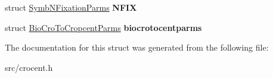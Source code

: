 \begin{DoxyCompactItemize}
\item 
\hypertarget{structcropcent_environment_a3fb9ba143595d6a68b7490a5c789a039}{struct \hyperlink{struct_symb_n_fixation_parms}{Symb\-N\-Fixation\-Parms} {\bfseries N\-F\-I\-X}}\label{structcropcent_environment_a3fb9ba143595d6a68b7490a5c789a039}

\item 
\hypertarget{structcropcent_environment_a3de6f21e80ca892d2b467459a710e5b6}{struct \hyperlink{struct_bio_cro_to_cropcent_parms}{Bio\-Cro\-To\-Cropcent\-Parms} {\bfseries biocrotocentparms}}\label{structcropcent_environment_a3de6f21e80ca892d2b467459a710e5b6}

\end{DoxyCompactItemize}


The documentation for this struct was generated from the following file\-:\begin{DoxyCompactItemize}
\item 
src/crocent.\-h\end{DoxyCompactItemize}
